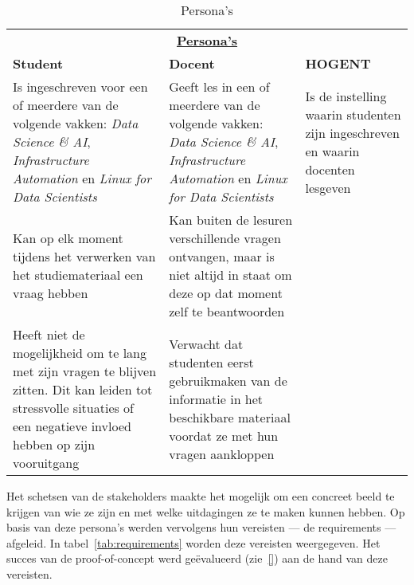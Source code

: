 \begin{table}[ht]
    \small 
    \centering
    \begin{tabular}{p{5cm} p{5cm} p{5cm}}
        \multicolumn{3}{c}{\uline{\textbf{Persona's}}} \\
        \addlinespace[0.5ex]
        \textbf{Student} & \textbf{Docent} & \textbf{HOGENT}\\
        \midrule
        Is ingeschreven voor een of meerdere van de volgende vakken: \textit{Data Science \& AI}, \textit{Infrastructure Automation} en \textit{Linux for Data Scientists} &
        Geeft les in een of meerdere van de volgende vakken: \textit{Data Science \& AI}, \textit{Infrastructure Automation} en \textit{Linux for Data Scientists} & 
        Is de instelling waarin studenten zijn ingeschreven en waarin docenten lesgeven \\
        Kan op elk moment tijdens het verwerken van het studiemateriaal een vraag hebben &
        Kan buiten de lesuren verschillende vragen ontvangen, maar is niet altijd in staat om deze op dat moment zelf te beantwoorden & \\
        Heeft niet de mogelijkheid om te lang met zijn vragen te blijven zitten. Dit kan leiden tot stressvolle situaties of een negatieve invloed hebben op zijn vooruitgang &
        Verwacht dat studenten eerst gebruikmaken van de informatie in het beschikbare materiaal voordat ze met hun vragen aankloppen & \\
        \bottomrule
    \end{tabular}
    \caption{Persona's}
    \label{tab:personas}
\end{table}

Het schetsen van de stakeholders maakte het mogelijk om een concreet beeld te krijgen van wie ze zijn en met welke uitdagingen ze te maken kunnen hebben. Op basis van deze persona’s werden vervolgens hun vereisten — de requirements — afgeleid. In tabel~\ref{tab:requirements} worden deze vereisten weergegeven. Het succes van de proof-of-concept werd geëvalueerd (zie~\ref{}) aan de hand van deze vereisten.


